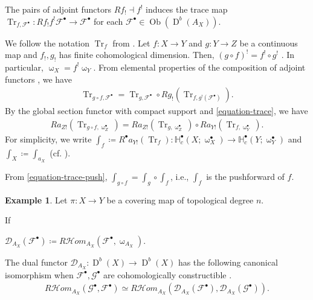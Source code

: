 \documentclass[a4paper,dvipdfmx,reqno,12pt]{amsart}
\theoremstyle{definition}
\newtheorem{example}[theorem]{Example}
\newcommand{\deq}{\coloneqq}
\newcommand{\opn}[1]{\operatorname{#1}}
\numberwithin{equation}{section}
\begin{document}
The pairs of adjoint functors $Rf_! \dashv f^{!}$ 
induces the trace map $\opn{Tr}_{f,\mathcal{F}^{\bullet}}\colon Rf_!f^{!}\mathcal{F}^{\bullet}
\to \mathcal{F}^{\bullet}$ for each 
$\mathcal{F}^{\bullet}\in \opn{Ob}(\opn{D}^{b}(A_X))$.

We follow the notation $\opn{Tr}_f$ from 
\cite[p.20]{MR1299726}.
Let $f\colon X\to Y $ and $g\colon Y\to Z$ be 
a continuous map and $f_!,g_!$ has finite cohomological 
dimension. Then, $(g\circ f)^{!}=f^{!}\circ g^{!}$
\cite[Proposition 3.1.8]{MR1299726}.
In particular, $\upomega_X=f^{!}\upomega_Y$.
From elemental properties of the composition of
adjoint functors \cite[p.103]{MR1712872}, we have
\begin{align}
\label{equation-trace}
\opn{Tr}_{g\circ f,\mathcal{F}^{\bullet}}=
\opn{Tr}_{g,\mathcal{F}^{\bullet}} 
\circ Rg_!(\opn{Tr}_{f,g^{!}(\mathcal{F}^{\bullet})}).
\end{align}
By the global section functor with compact support and
\cref{equation-trace}, we have
\begin{align}
\label{equation-trace-push}
Ra_{Z!}(\opn{Tr}_{g\circ f,\upomega_{Z}^{\bullet}})
=Ra_{Z!}(\opn{Tr}_{g,\upomega_{Z}^{\bullet}})
\circ Ra_{Y!}(\opn{Tr}_{f,\upomega_{Y}^{\bullet}}).
\end{align}
For simplicity, we write $\int_f\deq 
R^{\bullet}a_{Y!}(\opn{Tr}_{f})\colon 
\mathbb{H}^{\bullet}_c(X;\upomega_{X}^{\bullet})\to 
\mathbb{H}^{\bullet}_c(Y;\upomega_{Y}^{\bullet})$
and $\int_X\deq \int_{a_X}$
(cf. ).

From \cref{equation-trace-push}, 
$\int_{g\circ f}=\int_{g}\circ \int_{f}$, i.e., 
$\int_f$ is the pushforward of $f$.

\begin{example}
Let $\pi \colon X\to Y$ be a covering map of topological 
degree $n$.
\end{example}

If

$\mathcal{D}_{A_X}(\mathcal{F}^{\bullet})
\deq R\mathcal{H}om_{A_X}(\mathcal{F}^{\bullet},
\upomega_{A_X})$.

The dual functor
$\mathcal{D}_{A_X}\colon \opn{D}^{b}(X)\to \opn{D}^{b}(X)$
has the following canonical isomorphism when 
$\mathcal{F}^{\bullet},\mathcal{G}^{\bullet}$ are 
cohomologically constructible 
\cite[Proposition 3.4.6]{MR1299726}. 
\begin{align}
R \mathcal{H}om_{A_X}(\mathcal{G}^{\bullet},
\mathcal{F}^{\bullet})\simeq 
R \mathcal{H}om_{A_X}(
\mathcal{D}_{A_X}(\mathcal{F}^{\bullet}),
\mathcal{D}_{A_X}(\mathcal{G}^{\bullet})).
\end{align}
\end{document}
